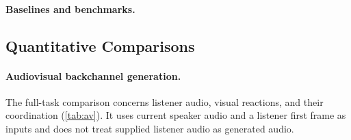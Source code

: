 \paragraph{Baselines and benchmarks.}




\subsection{Quantitative Comparisons}
\label{sec:quantitative}
\paragraph{Audiovisual backchannel generation.}
The full-task comparison concerns listener audio, visual reactions, and their coordination (\cref{tab:av}). It uses current speaker audio and a listener first frame as inputs and does not treat supplied listener audio as generated audio.


